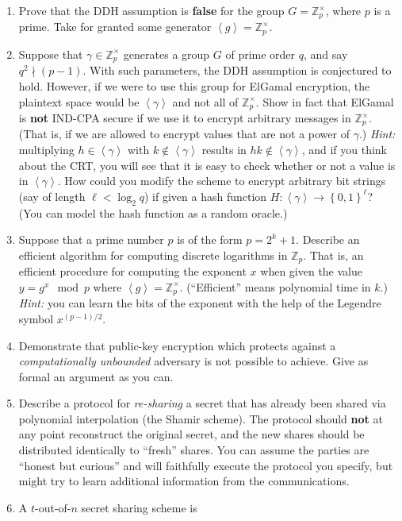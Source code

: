 \documentclass[12pt]{article}
\newcommand{\Z}{\mathbb{Z}}
\newcommand{\set}[1]{\left\{ #1 \right\}}
\newcommand{\bit}{\set{0,1}}
\newcommand{\gen}[1]{\left\langle #1 \right\rangle}
\renewcommand{\to}{\longrightarrow}
\begin{document}
\begin{enumerate}
  \item Prove that the DDH assumption is \textbf{false} for the group
	\(G=\Z_p^\times\), where \(p\) is a prime.  Take for granted some
	generator \(\gen{g} = \Z_p^\times\).
  \item Suppose that \(\gamma\in \Z_p^\times\) generates a group \(G\) of
	prime order \(q\), and say \(q^2\nmid (p-1)\).  With such parameters, the
	DDH assumption is conjectured to hold.  However, if we were to use this
	group for ElGamal encryption, the plaintext space would be
	\(\gen{\gamma}\) and not all of \(\Z_p^\times\).  Show in fact that
	ElGamal is \textbf{not} IND-CPA secure if we use it to encrypt arbitrary
	messages in \(\Z_p^\times\).  (That is, if we are allowed to encrypt
	values that are not a power of \(\gamma\).) \emph{Hint:} multiplying
	\(h\in\gen{\gamma}\) with \(k\not\in\gen{\gamma}\) results in
	\(hk\not\in\gen{\gamma}\), and if you think about the CRT, you will see
	that it is easy to check whether or not a value is in \(\gen{\gamma}\).
	How could you modify the scheme to encrypt arbitrary bit strings (say of
	length \(\ell < \log_2 q\)) if given a hash function
	\(H:\gen{\gamma}\to\bit^\ell\)?  (You can model the hash function as a
	random oracle.)
  \item Suppose that a prime number \(p\) is of the form \(p = 2^k+1\).
	Describe an efficient algorithm for computing discrete logarithms in
	\(\Z_p\).  That is, an efficient procedure for computing the exponent
	\(x\) when given the value \(y = g^x\mod p\) where \(\gen{g} =
	\Z_p^\times\).  (``Efficient'' means polynomial time in \(k\).)
	\emph{Hint:} you can learn the bits of the exponent with the help of the
	Legendre symbol \(x^{(p-1)/2}\).
  \item Demonstrate that public-key encryption which protects against a
	\emph{computationally unbounded} adversary is not possible to achieve.
	Give as formal an argument as you can.
  \item Describe a protocol for \emph{re-sharing} a secret that has already
	been shared via polynomial interpolation (the Shamir scheme).  The
	protocol should \textbf{not} at any point reconstruct the original secret,
	and the new shares should be distributed identically to ``fresh'' shares.
	You can assume the parties are ``honest but curious'' and will faithfully
	execute the protocol you specify, but might try to learn additional
	information from the communications.
  \item A \(t\)-out-of-\(n\) secret sharing scheme is

\end{enumerate}
\end{document}
